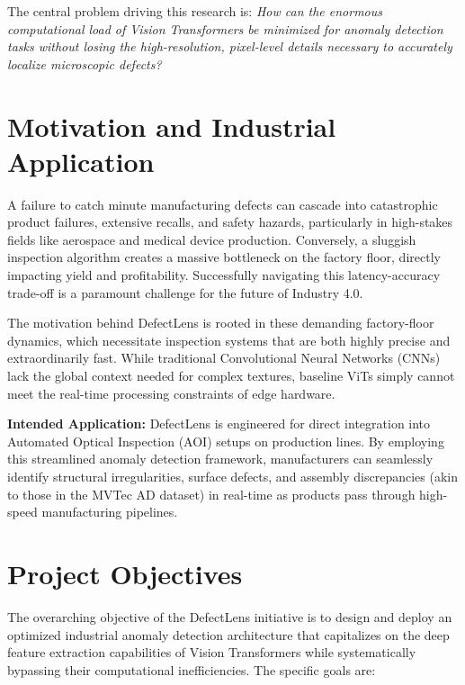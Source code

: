 \documentclass[12pt]{article}
\begin{document}
The central problem driving this research is: \textit{How can the enormous computational load of Vision Transformers be minimized for anomaly detection tasks without losing the high-resolution, pixel-level details necessary to accurately localize microscopic defects?}

\section{Motivation and Industrial Application}
A failure to catch minute manufacturing defects can cascade into catastrophic product failures, extensive recalls, and safety hazards, particularly in high-stakes fields like aerospace and medical device production. Conversely, a sluggish inspection algorithm creates a massive bottleneck on the factory floor, directly impacting yield and profitability. Successfully navigating this latency-accuracy trade-off is a paramount challenge for the future of Industry 4.0.

The motivation behind DefectLens is rooted in these demanding factory-floor dynamics, which necessitate inspection systems that are both highly precise and extraordinarily fast. While traditional Convolutional Neural Networks (CNNs) lack the global context needed for complex textures, baseline ViTs simply cannot meet the real-time processing constraints of edge hardware.

\textbf{Intended Application:} DefectLens is engineered for direct integration into Automated Optical Inspection (AOI) setups on production lines. By employing this streamlined anomaly detection framework, manufacturers can seamlessly identify structural irregularities, surface defects, and assembly discrepancies (akin to those in the MVTec AD dataset) in real-time as products pass through high-speed manufacturing pipelines.

\section{Project Objectives}
The overarching objective of the DefectLens initiative is to design and deploy an optimized industrial anomaly detection architecture that capitalizes on the deep feature extraction capabilities of Vision Transformers while systematically bypassing their computational inefficiencies. The specific goals are:
\end{document}
